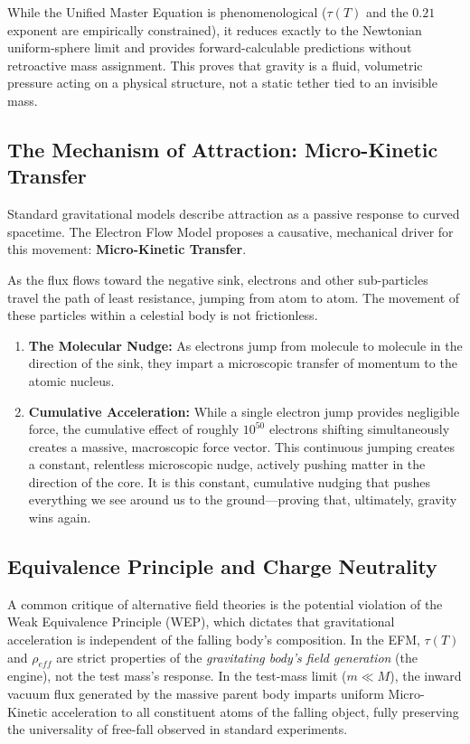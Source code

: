 \documentclass[11pt, a4paper]{article}
\begin{document}
  While the Unified Master Equation is phenomenological ($\tau(T)$ and the $0.21$ exponent are empirically constrained), it reduces exactly to the Newtonian uniform-sphere limit and provides forward-calculable predictions without retroactive mass assignment. This proves that gravity is a fluid, volumetric pressure acting on a physical structure, not a static tether tied to an invisible mass.

\subsection{The Mechanism of Attraction: Micro-Kinetic Transfer}
Standard gravitational models describe attraction as a passive response to curved spacetime. The Electron Flow Model proposes a causative, mechanical driver for this movement: \textbf{Micro-Kinetic Transfer}.

As the flux flows toward the negative sink, electrons and other sub-particles travel the path of least resistance, jumping from atom to atom. The movement of these particles within a celestial body is not frictionless.
\begin{enumerate}
  \item \textbf{The Molecular Nudge:} As electrons jump from molecule to molecule in the direction of the sink, they impart a microscopic transfer of momentum to the atomic nucleus.
  \item \textbf{Cumulative Acceleration:} While a single electron jump provides negligible force, the cumulative effect of roughly $10^{50}$ electrons shifting simultaneously creates a massive, macroscopic force vector. This continuous jumping creates a constant, relentless microscopic nudge, actively pushing matter in the direction of the core. It is this constant, cumulative nudging that pushes everything we see around us to the ground---proving that, ultimately, gravity wins again.
\end{enumerate}

\subsection{Equivalence Principle and Charge Neutrality}
A common critique of alternative field theories is the potential violation of the Weak Equivalence Principle (WEP), which dictates that gravitational acceleration is independent of the falling body's composition. In the EFM, $\tau(T)$ and $\rho_{eff}$ are strict properties of the \textit{gravitating body's field generation} (the engine), not the test mass's response. In the test-mass limit ($m \ll M$), the inward vacuum flux generated by the massive parent body imparts uniform Micro-Kinetic acceleration to all constituent atoms of the falling object, fully preserving the universality of free-fall observed in standard experiments.
\end{document}
